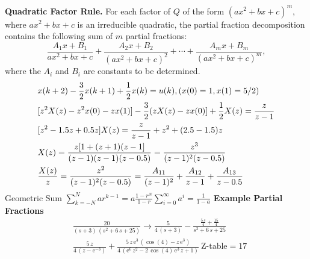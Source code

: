 \begin{multicols}{3}
\medskip
\noindent
{\bf Quadratic Factor Rule.}  
For each factor of $Q$ of the form $(ax^2+bx+c)^m$, 
where $ax^2+bx+c$ is an irreducible quadratic, 
the partial fraction decomposition contains 
the following sum of $m$ partial fractions:  
\[
\frac{A_1x+B_1}{ax^2+bx+c} + \frac{A_2x+B_2}{(ax^2+bx+c)^2} + \cdots 
  + \frac{A_mx+B_m}{(ax^2+bx+c)^m},
\]
where the $A_i$ and $B_i$ are constants to be determined. 
\begin{align*}
& x(k+2)-\frac{3}{2}x(k+1)+\frac{1}{2}x(k)=u(k), \text(x(0)=1,x(1)=5/2) \\
& [z^2X(z)-z^2x(0)-zx(1)]-\frac{3}{2}(zX(z)-zx(0)]+\frac{1}{2}X(z)=\frac{z}{z-1} \\
& [z^2-1.5z+0.5z]X(z)= \frac{z}{z-1}+z^2+(2.5-1.5)z \\
& X(z) = \frac{z[1+(z+1)(z-1]}{(z-1)(z-1)(z-0.5)}=\frac{z^3}{(z-1)^2(z-0.5)} \\
& \frac{X(z)}{z}=\frac{z^2}{(z-1)^2(z-0.5)}=\frac{A_{11}}{(z-1)^2}+\frac{A_{12}}{z-1}+\frac{A_{13}}{z-0.5}
\end{align*}
Geometric Sum $\sum\limits_{k = -N}^{N} {ar^{k - 1} = a\frac{1-r^{N}}{{1 - r}}} \sum_{i=0}^\infty a^i=\frac{1}{1-a}$
\textbf{Example Partial Fractions}
\begin{align*}
& \frac{20}{\left(s+3\right)\,\left(s^2+6\,s+25\right)} \rightarrow 
\frac{5}{4\,\left(s+3\right)}-\frac{\frac{5\,s}{4}+\frac{15}{4}}{s^2+6\,s+25} \\
& \frac{5\,z}{4\,\left(z-{\mathrm{e}}^{-3}\right)}+\frac{5\,z\,{\mathrm{e}}^3\,\left(\cos\left(4\right)-z\,{\mathrm{e}}^3\right)}{4\,\left({\mathrm{e}}^6\,z^2-2\,\cos\left(4\right)\,{\mathrm{e}}^3\,z+1\right)} \ \text{Z-table} = \text{17}
\end{align*}

\end{multicols}

